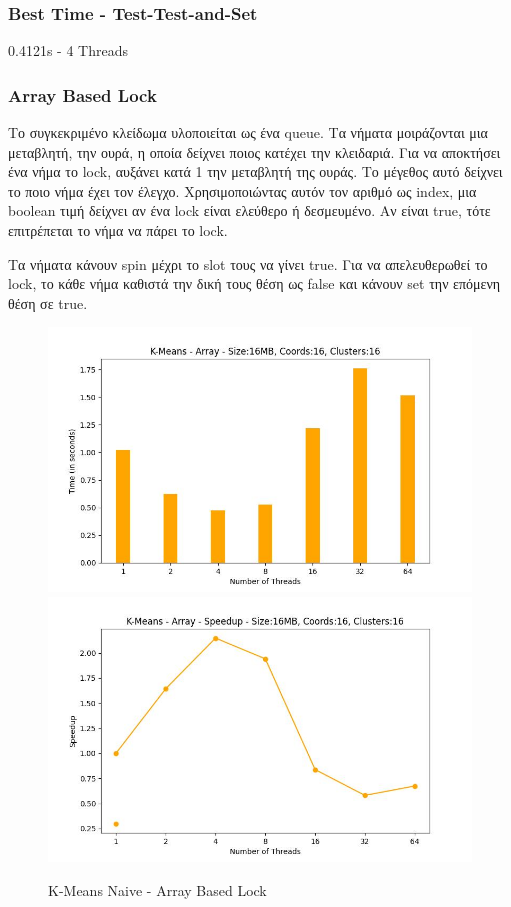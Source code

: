 \documentclass[letterpaper,12pt]{article}
\begin{document}
\subsubsection*{Best Time - Test-Test-and-Set}
0.4121s - 4 Threads

\subsubsection{Array Based Lock}

Το συγκεκριμένο κλείδωμα υλοποιείται ως ένα queue. Τα νήματα μοιράζονται μια μεταβλητή, την ουρά,
η οποία δείχνει ποιος κατέχει την κλειδαριά. Για να αποκτήσει ένα νήμα το lock, αυξάνει κατά 1 την 
μεταβλητή της ουράς. Το μέγεθος αυτό δείχνει το ποιο νήμα έχει τον έλεγχο. Χρησιμοποιώντας αυτόν τον
αριθμό ως index, μια boolean τιμή δείχνει αν ένα lock είναι ελεύθερο ή δεσμευμένο. Αν είναι true, τότε επιτρέπεται
το νήμα να πάρει το lock.

Τα νήματα κάνουν spin μέχρι το slot τους να γίνει true. Για να απελευθερωθεί το lock, το κάθε νήμα
καθιστά την δική τους θέση ως false και κάνουν set την επόμενη θέση σε true.

\begin{figure}[H]
    \centering
        \includegraphics[scale=0.4]{outFilesCores/plots/kmeans_locks_array.jpg}
        \includegraphics[scale=0.4]{outFilesCores/plots/kmeans_locks_array_speedup.jpg}
    \caption{K-Means Naive - Array Based Lock}
    \label{fig:K-Means Naive - Array Based Lock}
\end{figure}
\end{document}
